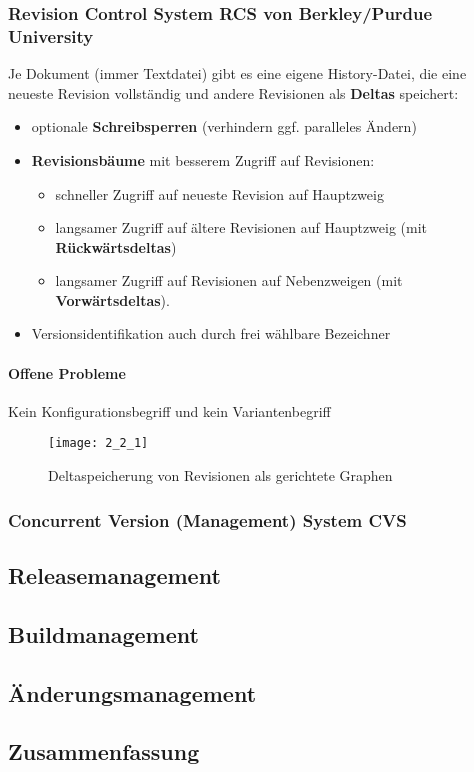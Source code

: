 \subsubsection{Revision Control System RCS von Berkley/Purdue University}Je Dokument (immer Textdatei) gibt es eine eigene History-Datei, die eine neueste Revision vollständig und andere Revisionen als \textbf{Deltas} speichert:
\begin{itemize}
	\item optionale \textbf{Schreibsperren} (verhindern ggf. paralleles Ändern)
	\item \textbf{Revisionsbäume} mit besserem Zugriff auf Revisionen:
	\begin{itemize}
		\item schneller Zugriff auf neueste Revision auf Hauptzweig
		\item langsamer Zugriff auf ältere Revisionen auf Hauptzweig  (mit \textbf{Rückwärtsdeltas})
		\item langsamer Zugriff auf Revisionen auf Nebenzweigen (mit \textbf{Vorwärtsdeltas}).
	\end{itemize}
	\item Versionsidentifikation auch durch frei wählbare Bezeichner
\end{itemize}
\paragraph{Offene Probleme}
Kein Konfigurationsbegriff und kein Variantenbegriff
\begin{figure}[h]
	\caption{Deltaspeicherung von Revisionen als gerichtete Graphen}
	\centering
	\texttt{[image: 2\_2\_1]}
\end{figure}
\subsubsection{Concurrent Version (Management) System CVS}
\subsection{Releasemanagement}
\subsection{Buildmanagement}
\subsection{Änderungsmanagement}
\subsection{Zusammenfassung}




